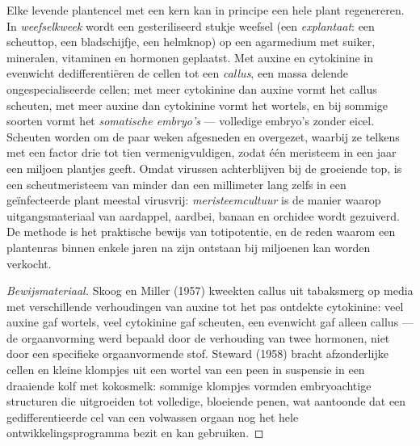 \begin{proposition}\label{prop:b2:asexual-reproduction:tissueculture}
Elke levende plantencel met een kern kan in principe een hele plant
regenereren. In \emph{weefselkweek} wordt een gesteriliseerd stukje weefsel
(een \emph{explantaat}: een scheuttop, een bladschijfje, een helmknop) op
een agarmedium met suiker, mineralen, vitaminen en hormonen geplaatst. Met
auxine en cytokinine in evenwicht dedifferentiëren de cellen tot een
\emph{callus}, een massa delende ongespecialiseerde cellen; met meer
cytokinine dan auxine vormt het callus scheuten, met meer auxine dan
cytokinine vormt het wortels, en bij sommige soorten vormt het
\emph{somatische embryo's} --- volledige embryo's zonder eicel. Scheuten
worden om de paar weken afgesneden en overgezet, waarbij ze telkens met
een factor drie tot tien vermenigvuldigen, zodat één meristeem in een jaar
een miljoen plantjes geeft. Omdat virussen achterblijven bij de groeiende
top, is een scheutmeristeem van minder dan een millimeter lang zelfs in een
geïnfecteerde plant meestal virusvrij: \emph{meristeemcultuur} is de manier
waarop uitgangsmateriaal van aardappel, aardbei, banaan en orchidee wordt
gezuiverd. De methode is het praktische bewijs van totipotentie, en de
reden waarom een plantenras binnen enkele jaren na zijn ontstaan bij
miljoenen kan worden verkocht.
\end{proposition}
\begin{proof}[Bewijsmateriaal]
Skoog en Miller (1957) kweekten callus uit tabaksmerg op media met
verschillende verhoudingen van auxine tot het pas ontdekte cytokinine: veel
auxine gaf wortels, veel cytokinine gaf scheuten, een evenwicht gaf alleen
callus --- de orgaanvorming werd bepaald door de verhouding van twee
hormonen, niet door een specifieke orgaanvormende stof. Steward (1958)
bracht afzonderlijke cellen en kleine klompjes uit een wortel van een peen
in suspensie in een draaiende kolf met kokosmelk: sommige klompjes vormden
embryoachtige structuren die uitgroeiden tot volledige, bloeiende penen,
wat aantoonde dat een gedifferentieerde cel van een volwassen orgaan nog
het hele ontwikkelingsprogramma bezit en kan gebruiken.
\end{proof}

